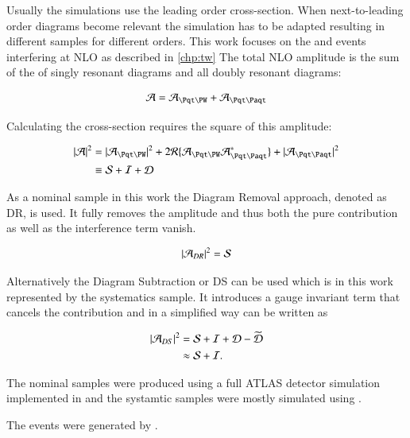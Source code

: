 Usually the simulations use the leading order cross-section.
When next-to-leading order diagrams become relevant the simulation has to be adapted resulting in different samples for different orders.
This work focuses on the \tW and \ttbar events interfering at NLO as described in \ref{chp:tw}
The total NLO amplitude is the sum of the of singly resonant diagrams and all doubly resonant diagrams:

\begin{align}
\Aamp = \Atw + \Att
\end{align}

Calculating the cross-section requires the square of this amplitude:

\begin{align}
|\Aamp|^2 &= |\Atw|^2 + 2 \mathcal{R} \{ \Atw \Att^{\ast} \} + |\Att|^2 \\
&\equiv \Samp + \Iamp + \Damp
\end{align}

As a nominal sample in this work the Diagram Removal approach, denoted as DR, is used. It fully removes the \Att amplitude and thus both the pure \ttbar contribution as well as the interference term vanish.

\begin{align}
| \mathcal{A}_{DR} |^2 = \mathcal{S}
\end{align}

Alternatively the Diagram Subtraction or DS can be used which is in this work represented by the systematics sample. It introduces a gauge invariant term that cancels the \ttbar contribution and in a simplified way can be written as

\begin{align}
| \mathcal{A}_{DS} |^2 &= \mathcal{S} + \mathcal{I} + \mathcal{D} - \widetilde{\mathcal{D}}\\
&\approx \mathcal{S} + \mathcal{I}.
\end{align}

The nominal samples were produced using a full ATLAS detector simulation implemented in \GEANTfour and the systamtic samples were mostly simulated using \ATLFASTtwo.~\cite{geant, atlfast}

The events were generated by \POWHEG{}.~\cite{pythia}



